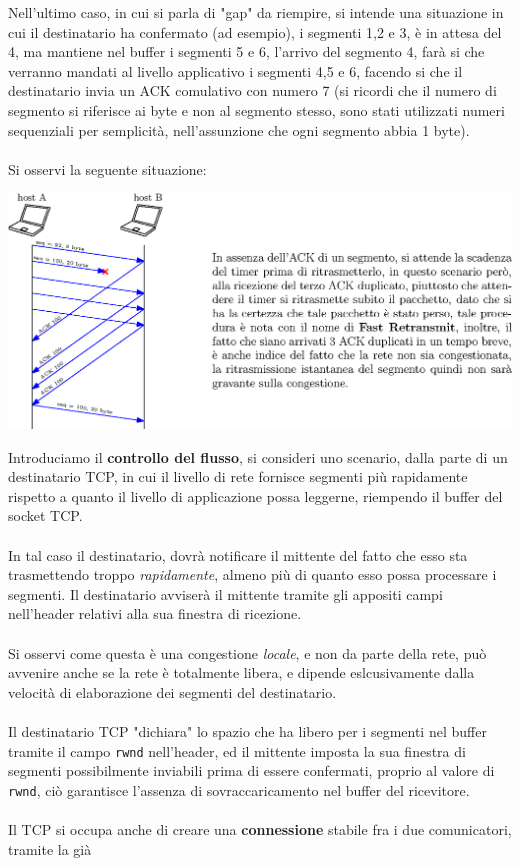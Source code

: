 \documentclass[12pt, letterpaper]{article}
\newcommand{\code}[1]{\colorbox{light-gray}{\texttt{#1}}}
\newcommand{\acc}{\\\hphantom{}\\}
\begin{document}
Nell'ultimo caso, in cui si parla di "gap" da riempire, si intende una situazione in cui il destinatario ha confermato
(ad esempio), i segmenti 1,2 e 3, è in attesa del 4, ma mantiene nel buffer i segmenti 5 e 6, l'arrivo del
segmento 4, farà si che verranno mandati al livello applicativo i segmenti 4,5 e 6, facendo si che il destinatario
invia un ACK comulativo con numero 7 (si ricordi che il numero di segmento si riferisce ai byte e non al segmento
stesso, sono stati utilizzati numeri sequenziali per semplicità, nell'assunzione che ogni segmento abbia 1 byte).\acc
Si osservi la seguente situazione:\begin{center}
    \includegraphics[width=\textwidth ]{images/fastRetrasmit.eps}
\end{center}
Introduciamo il \textbf{controllo del flusso}, si consideri uno scenario, dalla parte di un destinatario
TCP, in cui il livello di rete fornisce segmenti più rapidamente rispetto a quanto il livello di applicazione
possa leggerne, riempendo il buffer del socket TCP. \acc In tal caso il destinatario, dovrà notificare il mittente del
fatto che esso sta trasmettendo troppo \textit{rapidamente}, almeno più di quanto esso possa processare i
segmenti. Il destinatario avviserà il mittente tramite gli appositi campi nell'header relativi alla sua finestra
di ricezione.\acc
Si osservi come questa è una congestione \textit{locale}, e non da parte della rete, può avvenire anche se la rete
è totalmente libera, e dipende eslcusivamente dalla velocità di elaborazione dei segmenti del destinatario.\acc
Il destinatario TCP "dichiara" lo spazio che ha libero per i segmenti nel buffer tramite il
campo \code{rwnd} nell'header, ed il mittente imposta la sua finestra di segmenti possibilmente
inviabili prima di essere confermati, proprio al valore di \code{rwnd}, ciò garantisce l'assenza di
sovraccaricamento nel buffer del ricevitore.\acc
Il TCP si occupa anche di creare una \textbf{connessione} stabile fra i due comunicatori, tramite la già
\end{document}
